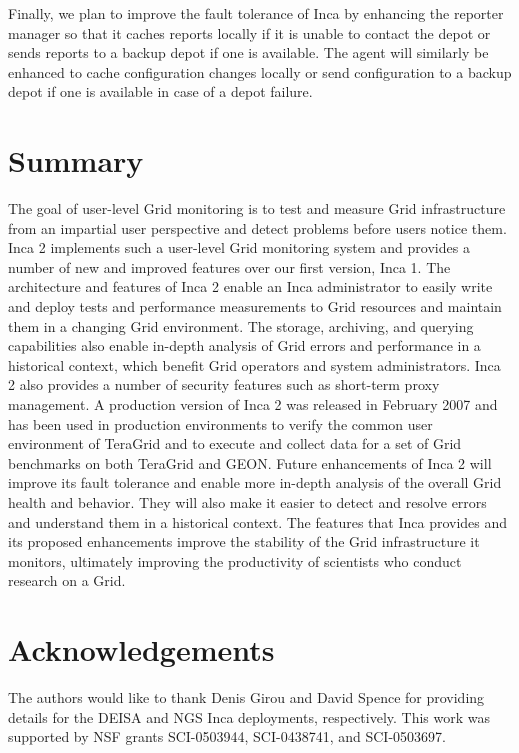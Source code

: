 \documentclass{sig-alternate}
\begin{document}
Finally, we plan to improve the fault tolerance of Inca by enhancing the
reporter manager so that it caches reports locally if it is unable to
contact the depot or sends reports to a backup depot if one is available.
The agent will similarly be enhanced to cache configuration changes locally or
send configuration to a backup depot if one is available in case of a depot
failure.

\section{Summary}

The goal of user-level Grid monitoring is to test and measure Grid
infrastructure from an impartial user perspective and detect problems before
users notice them.  Inca 2 implements such a user-level Grid monitoring system
and provides a number of new and improved features over our first version,
Inca 1.  The architecture and features of Inca 2 enable an Inca administrator
to easily write and deploy tests and performance measurements to Grid
resources and maintain them in a changing Grid environment.  The storage,
archiving, and querying capabilities also enable in-depth analysis of Grid
errors and performance in a historical context, which benefit Grid
operators and system administrators.  Inca 2 also provides a number of
security features such as short-term proxy management.
A production version of Inca 2 was released in February 2007 and
has been used in production environments to verify the common user environment
of TeraGrid and to execute and collect data for a set of Grid benchmarks on
both TeraGrid and GEON.  Future enhancements of Inca 2 will improve its fault
tolerance and enable more in-depth analysis of the overall Grid health and
behavior.  They will also make it easier to detect and resolve errors
and understand them in a historical context.  The features that Inca
provides and its proposed enhancements improve the stability of the
Grid infrastructure it monitors, ultimately improving the productivity of
scientists who conduct research on a Grid. 

\section{Acknowledgements}

The authors would like to thank Denis Girou and David Spence for providing
details for the DEISA and NGS Inca deployments, respectively.  This work was
supported by NSF grants SCI-0503944, SCI-0438741, and SCI-0503697.



\end{document}
